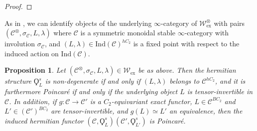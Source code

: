 \documentclass{article}
\newtheorem{proposition}[equation]{Proposition}
\theoremstyle{definition}
\begin{document}
\begin{proof}
    
\end{proof}
As in \cite[p. 15]{CHN2024}, we can identify objects of the underlying $ \infty $-category of $ \mathcal{W}_{\mathrm{ex}}^\otimes $ with pairs $ \left(\mathcal{C}^\otimes, \sigma_\mathcal{C}, L, \lambda\right) $ where $ \mathcal{C} $ is a symmetric monoidal stable $ \infty $-category with involution $ \sigma_{\mathcal{C}} $, and $ (L, \lambda) \in \mathrm{Ind}(\mathcal{C})^{hC_2} $ is a fixed point with respect to the induced action on $ \mathrm{Ind}(\mathcal{C})$. 
\begin{proposition}
    Let $  \left(\mathcal{C}^\otimes, \sigma_\mathcal{C}, L, \lambda\right) \in \mathcal{W}_{\mathrm{ex}} $ be as above. 
    Then the hermitian structure $ \Qoppa^s_{L} $ is non-degenerate if and only if $ (L,\lambda) $ belongs to $ \mathcal{C}^{hC_2} $, and it is furthermore Poincaré if and only if the underlying object $ L $ is tensor-invertible in $ \mathcal{C} $. 
    In addition, if $ g \colon \mathcal{C} \to \mathcal{C}' $ is a $ C_2 $-equivariant exact functor, $ L \in \mathcal{C}^{BC_2} $ and $ L' \in (\mathcal{C}')^{BC_2} $ are tensor-invertible, and $ g(L) \simeq L' $ an equivalence, then the induced hermitian functor $ \left(\mathcal{C}, \Qoppa^s_{L}\right) \left(\mathcal{C}', \Qoppa^s_{L'}\right) $ is Poincaré. 
\end{proposition}
\end{document}
